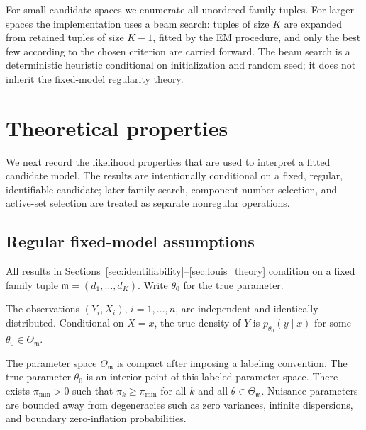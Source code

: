 For small candidate spaces we enumerate all unordered family tuples.  For
larger spaces the implementation uses a beam search: tuples of size \(K\) are
expanded from retained tuples of size \(K-1\), fitted by the EM procedure, and
only the best few according to the chosen criterion are carried forward.  The
beam search is a deterministic heuristic conditional on initialization and
random seed; it does not inherit the fixed-model regularity theory.

\section{Theoretical properties}
\label{sec:theory}

We next record the likelihood properties that are used to interpret a fitted
candidate model.  The results are intentionally conditional on a fixed,
regular, identifiable candidate; later family search, component-number
selection, and active-set selection are treated as separate nonregular
operations.

\subsection{Regular fixed-model assumptions}

All results in Sections~\ref{sec:identifiability}--\ref{sec:louis_theory}
condition on a fixed family tuple \(\mathfrak m=(d_1,\ldots,d_K)\).  Write
\(\theta_0\) for the true parameter.

\begin{assumption}[Sampling]
\label{ass:sampling}
The observations \((Y_i,X_i)\), \(i=1,\ldots,n\), are independent and
identically distributed.  Conditional on \(X=x\), the true density of \(Y\) is
\(p_{\theta_0}(y\mid x)\) for some \(\theta_0\in\Theta_{\mathfrak m}\).
\end{assumption}

\begin{assumption}
\label{ass:param_space}
The parameter space \(\Theta_{\mathfrak m}\) is compact after imposing a
labeling convention.  The true parameter \(\theta_0\) is an interior point of
this labeled parameter space.  There exists \(\pi_{\min}>0\) such that
\(\pi_k\ge \pi_{\min}\) for all \(k\) and all \(\theta\in\Theta_{\mathfrak m}\).
Nuisance parameters are bounded away from degeneracies such as zero variances,
infinite dispersions, and boundary zero-inflation probabilities.
\end{assumption}

